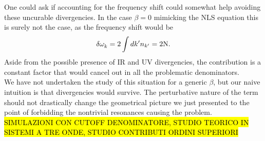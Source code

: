     One could ask if accounting for the frequency shift could somewhat help avoiding these uncurable divergencies. In the case
    $\beta = 0$ mimicking the NLS equation this is surely not the case, as the frequency shift would be
    \begin{equation}
        \delta \omega^{}_k = 2\int dk' n_{k'} = 2 \mathrm{N}. 
    \end{equation}
    Aside from the possible presence of IR and UV divergencies, the contribution is a constant factor that would cancel out in all
    the problematic denominators.\\
    We have not undertaken the study of this situation for a generic $\beta$, but our naive intuition is that divergencies would survive. The perturbative nature of the term  should not drastically change the geometrical picture we just presented to the point of forbidding the nontrivial resonances causing the problem.\\
    

    
    \hl{SIMULAZIONI CON CUTOFF DENOMINATORE, STUDIO TEORICO IN SISTEMI A TRE ONDE, STUDIO CONTRIBUTI ORDINI SUPERIORI}
    
